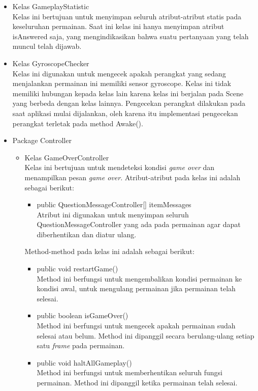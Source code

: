 \begin{itemize}
    \item Kelas GameplayStatistic\\
    Kelas ini bertujuan untuk menyimpan seluruh atribut-atribut statis pada keseluruhan permainan. Saat ini kelas ini hanya menyimpan atribut isAnswered saja, yang mengindikasikan bahwa suatu pertanyaan yang telah muncul telah dijawab. 
    \item Kelas GyroscopeChecker\\
    Kelas ini digunakan untuk mengecek apakah perangkat yang sedang menjalankan permainan ini memiliki sensor gyroscope. Kelas ini tidak memiliki hubungan kepada kelas lain karena kelas ini berjalan pada Scene yang berbeda dengan kelas lainnya. Pengecekan perangkat dilakukan pada saat aplikasi mulai dijalankan, oleh karena itu implementasi pengecekan perangkat terletak pada method Awake().
    \item Package Controller
    \begin{itemize}
        \item Kelas GameOverController\\
        Kelas ini bertujuan untuk mendeteksi kondisi \textit{game over} dan menampilkan pesan \textit{game over}.
        Atribut-atribut pada kelas ini adalah sebagai berikut:
        \begin{itemize}
            \item public QuestionMessageController[] itemMessages\\
            Atribut ini digunakan untuk menyimpan seluruh QuestionMessageController yang ada pada permainan agar dapat diberhentikan dan diatur ulang.
        \end{itemize}
        Method-method pada kelas ini adalah sebagai berikut:
        \begin{itemize}
            \item public void restartGame()\\
            Method ini berfungsi untuk mengembalikan kondisi permainan ke kondisi awal, untuk mengulang permainan jika permainan telah selesai.
            \item public boolean isGameOver()\\
            Method ini berfungsi untuk mengecek apakah permainan sudah selesai atau belum. Method ini dipanggil secara berulang-ulang setiap satu \textit{frame} pada permainan.
            \item public void haltAllGameplay()\\
            Method ini berfungsi untuk memberhentikan seluruh fungsi permainan. Method ini dipanggil ketika permainan telah selesai.

\end{itemize}
\end{itemize}
\end{itemize}
